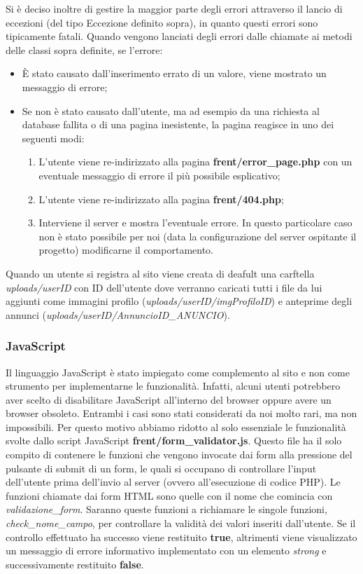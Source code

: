 \documentclass[1_relazione.tex]{subfiles}
\begin{document}
Si è deciso inoltre di gestire la maggior parte degli errori attraverso il lancio di eccezioni (del tipo Eccezione definito sopra), in quanto questi errori sono tipicamente fatali.
Quando vengono lanciati degli errori dalle chiamate ai metodi delle classi sopra definite, se l'errore:
\begin{itemize}
    \item \`{E} stato causato dall'inserimento errato di un valore, viene mostrato un messaggio di errore;
    \item Se non \`{e} stato causato dall'utente, ma ad esempio da una richiesta al database fallita o di una pagina inesistente, la pagina reagisce in uno dei seguenti modi:
    \begin{enumerate}
        \item L'utente viene re-indirizzato alla pagina \textbf{frent/error\_page.php} con un eventuale messaggio di errore il più possibile esplicativo;
        \item L'utente viene re-indirizzato alla pagina \textbf{frent/404.php};
        \item Interviene il server e mostra l'eventuale errore. In questo particolare caso non è stato possibile per noi (data la configurazione del server ospitante il progetto) modificarne il comportamento.
    \end{enumerate}
\end{itemize}
Quando un utente si registra al sito viene creata di deafult una carftella \textit{uploads/userID} con ID dell'utente dove verranno caricati tutti i file da lui aggiunti come immagini profilo (\textit{uploads/userID/imgProfiloID}) e anteprime degli annunci (\textit{uploads/userID/AnnuncioID\_ANUNCIO}).

\subsubsection{JavaScript}
Il linguaggio JavaScript \`{e} stato impiegato come complemento al sito e non come strumento per implementarne le funzionalità.
Infatti, alcuni utenti potrebbero aver scelto di disabilitare JavaScript all'interno del browser oppure avere un browser obsoleto. Entrambi i casi sono stati considerati da noi molto rari, ma non impossibili.
Per questo motivo abbiamo ridotto al solo essenziale le funzionalità svolte dallo script JavaScript \textbf{frent/form\_validator.js}.
Questo file ha il solo compito di contenere le funzioni che vengono invocate dai form alla pressione del pulsante di submit di un form, le quali si occupano di controllare l'input dell'utente prima dell'invio al server (ovvero all'esecuzione di codice PHP).
Le funzioni chiamate dai form HTML sono quelle con il nome che comincia con \textit{validazione\_form}. Saranno queste funzioni a richiamare le singole funzioni, \textit{check\_nome\_campo}, per controllare la validit\`{a} dei valori inseriti dall'utente.
Se il controllo effettuato ha successo viene restituito \textbf{true}, altrimenti viene visualizzato un messaggio di errore informativo implementato con un elemento \textit{strong} e successivamente restituito \textbf{false}.
\end{document}
